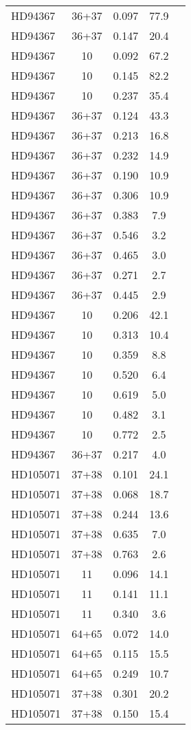 \begin{table*}
\begin{tabular}{l c c c c}
HD94367 & 36+37 & 0.097 & 77.9\\ 
HD94367 & 36+37 & 0.147 & 20.4\\ 
HD94367 & 10 & 0.092 & 67.2\\ 
HD94367 & 10 & 0.145 & 82.2\\ 
HD94367 & 10 & 0.237 & 35.4\\ 
HD94367 & 36+37 & 0.124 & 43.3\\ 
HD94367 & 36+37 & 0.213 & 16.8\\ 
HD94367 & 36+37 & 0.232 & 14.9\\ 
HD94367 & 36+37 & 0.190 & 10.9\\ 
HD94367 & 36+37 & 0.306 & 10.9\\ 
HD94367 & 36+37 & 0.383 & 7.9\\ 
HD94367 & 36+37 & 0.546 & 3.2\\ 
HD94367 & 36+37 & 0.465 & 3.0\\ 
HD94367 & 36+37 & 0.271 & 2.7\\ 
HD94367 & 36+37 & 0.445 & 2.9\\ 
HD94367 & 10 & 0.206 & 42.1\\ 
HD94367 & 10 & 0.313 & 10.4\\ 
HD94367 & 10 & 0.359 & 8.8\\ 
HD94367 & 10 & 0.520 & 6.4\\ 
HD94367 & 10 & 0.619 & 5.0\\ 
HD94367 & 10 & 0.482 & 3.1\\ 
HD94367 & 10 & 0.772 & 2.5\\ 
HD94367 & 36+37 & 0.217 & 4.0\\ 
\hline
HD105071 & 37+38 & 0.101 & 24.1\\ 
HD105071 & 37+38 & 0.068 & 18.7\\ 
HD105071 & 37+38 & 0.244 & 13.6\\ 
HD105071 & 37+38 & 0.635 & 7.0\\ 
HD105071 & 37+38 & 0.763 & 2.6\\ 
HD105071 & 11 & 0.096 & 14.1\\ 
HD105071 & 11 & 0.141 & 11.1\\ 
HD105071 & 11 & 0.340 & 3.6\\ 
HD105071 & 64+65 & 0.072 & 14.0\\ 
HD105071 & 64+65 & 0.115 & 15.5\\ 
HD105071 & 64+65 & 0.249 & 10.7\\ 
HD105071 & 37+38 & 0.301 & 20.2\\ 
HD105071 & 37+38 & 0.150 & 15.4\\ 

\end{tabular}
\end{table*}
